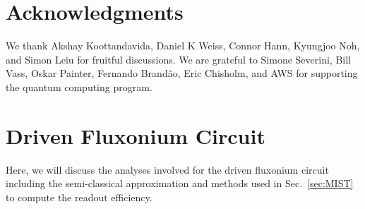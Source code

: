 \documentclass[prx,showpacs,notitlepage,twocolumn,superscriptaddress,nofootinbib,preprintnumbers,floatfix]{revtex4-2}
\begin{document}
\section{Acknowledgments}
 We thank Akshay Koottandavida, Daniel K Weiss, Connor Hann, Kyungjoo Noh, and Simon Leiu for fruitful discussions. We are grateful to Simone Severini, Bill Vass, Oskar Painter, Fernando Brand\~ao, Eric Chisholm, and AWS for supporting the quantum computing program. %
\appendix
\section{Driven Fluxonium Circuit}\label{app:MIST}
Here, we will discuss the analyses involved for the driven fluxonium circuit including the semi-classical approximation and methods used in Sec.~\ref{sec:MIST} to compute the readout efficiency. 
\end{document}
